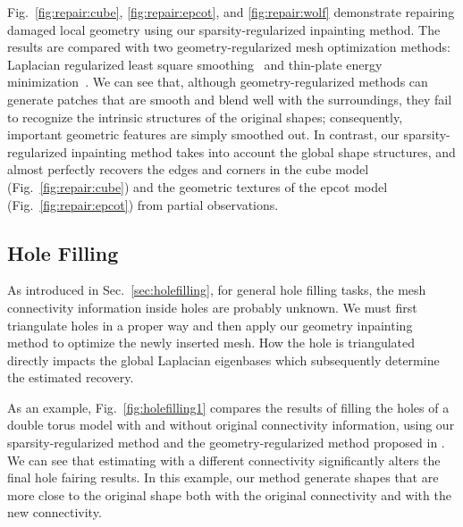 Fig.~\ref{fig:repair:cube}, \ref{fig:repair:epcot}, and \ref{fig:repair:wolf}
demonstrate repairing damaged local geometry using our sparsity-regularized inpainting method. The results
are compared with two geometry-regularized mesh optimization methods: Laplacian regularized least square smoothing~\cite{Nealen2006}
and thin-plate energy minimization~\cite{Bac2008}. We can see that, although geometry-regularized methods can generate patches
that are smooth and blend well with the surroundings, they fail to recognize the intrinsic structures of the original
shapes; consequently, important geometric features are simply smoothed out. In contrast, our sparsity-regularized inpainting method
takes into account the global shape structures, and almost perfectly recovers the edges and corners in the cube model (Fig.~\ref{fig:repair:cube})
and the geometric textures of the epcot model (Fig.~\ref{fig:repair:epcot}) from partial observations.


\subsection{Hole Filling}

As introduced in Sec.~\ref{sec:holefilling}, for general hole filling tasks, the mesh connectivity information
inside holes are probably unknown. We must first triangulate holes in a proper way and then apply our geometry
inpainting method to optimize the newly inserted mesh. How the hole is triangulated directly impacts the
global Laplacian eigenbases which subsequently determine the estimated recovery.

As an example, Fig.~\ref{fig:holefilling1} compares the results of filling the holes of a double torus
model with and without original connectivity information, using our sparsity-regularized method and the
geometry-regularized method proposed in \cite{Bac2008}. We can see that estimating with a different connectivity
significantly alters the final hole fairing results. In this example, our method generate shapes that are more
close to the original shape both with the original connectivity and with the new connectivity.

